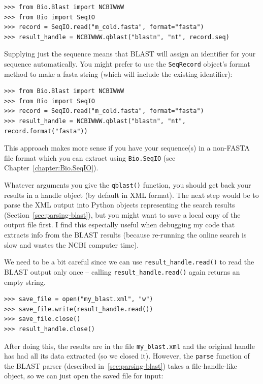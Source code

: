 \documentclass{report}
\begin{document}
\begin{verbatim}
>>> from Bio.Blast import NCBIWWW
>>> from Bio import SeqIO
>>> record = SeqIO.read("m_cold.fasta", format="fasta")
>>> result_handle = NCBIWWW.qblast("blastn", "nt", record.seq)
\end{verbatim}

Supplying just the sequence means that BLAST will assign an identifier
for your sequence automatically.  You might prefer to use the
\verb|SeqRecord| object's format method to make a fasta string
(which will include the existing identifier):

\begin{verbatim}
>>> from Bio.Blast import NCBIWWW
>>> from Bio import SeqIO
>>> record = SeqIO.read("m_cold.fasta", format="fasta")
>>> result_handle = NCBIWWW.qblast("blastn", "nt", record.format("fasta"))
\end{verbatim}

This approach makes more sense if you have your sequence(s) in a
non-FASTA file format which you can extract using \verb|Bio.SeqIO|
(see Chapter~\ref{chapter:Bio.SeqIO}).

Whatever arguments you give the \verb|qblast()| function, you should
get back your results in a handle object (by default in XML format).
The next step would be to parse the XML output into Python objects
representing the search results (Section~\ref{sec:parsing-blast}),
but you might want to save a local copy of the output file first.
I find this especially useful when debugging my code that extracts
info from the BLAST results (because re-running the online search
is slow and wastes the NCBI computer time).

\label{sec:saving-blast-output}

We need to be a bit careful since we can use \verb|result_handle.read()| to
read the BLAST output only once -- calling \verb|result_handle.read()| again
returns an empty string.

\begin{verbatim}
>>> save_file = open("my_blast.xml", "w")
>>> save_file.write(result_handle.read())
>>> save_file.close()
>>> result_handle.close()
\end{verbatim}

After doing this, the results are in the file \verb|my_blast.xml| and the
original handle has had all its data extracted (so we closed it). However,
the \verb|parse| function of the BLAST parser (described
in~\ref{sec:parsing-blast}) takes a file-handle-like object, so
we can just open the saved file for input:
\end{document}
